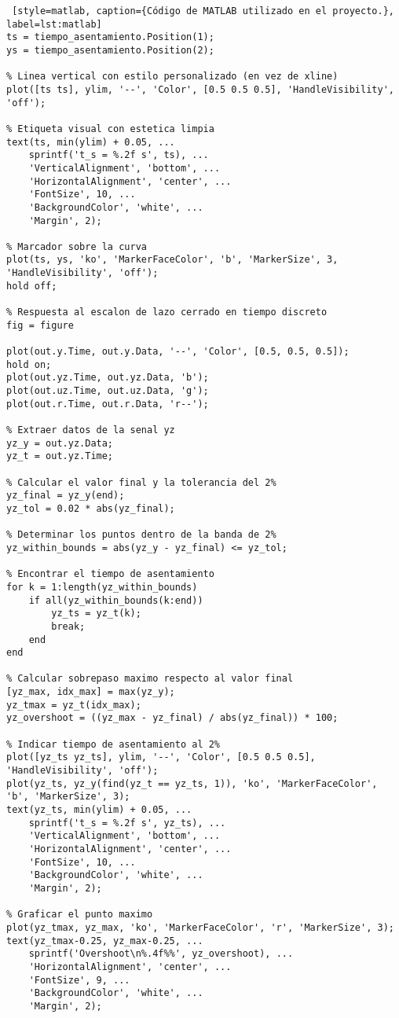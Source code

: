 \begin{adjustwidth}{0.5cm}{0.5cm}
\begin{lstlisting} [style=matlab, caption={Código de MATLAB utilizado en el proyecto.}, label=lst:matlab]
ts = tiempo_asentamiento.Position(1);
ys = tiempo_asentamiento.Position(2);

% Linea vertical con estilo personalizado (en vez de xline)
plot([ts ts], ylim, '--', 'Color', [0.5 0.5 0.5], 'HandleVisibility', 'off'); 

% Etiqueta visual con estetica limpia
text(ts, min(ylim) + 0.05, ... 
    sprintf('t_s = %.2f s', ts), ... 
    'VerticalAlignment', 'bottom', ... 
    'HorizontalAlignment', 'center', ... 
    'FontSize', 10, ... 
    'BackgroundColor', 'white', ... 
    'Margin', 2); 

% Marcador sobre la curva
plot(ts, ys, 'ko', 'MarkerFaceColor', 'b', 'MarkerSize', 3, 'HandleVisibility', 'off'); 
hold off; 

% Respuesta al escalon de lazo cerrado en tiempo discreto
fig = figure 

plot(out.y.Time, out.y.Data, '--', 'Color', [0.5, 0.5, 0.5]); 
hold on; 
plot(out.yz.Time, out.yz.Data, 'b'); 
plot(out.uz.Time, out.uz.Data, 'g'); 
plot(out.r.Time, out.r.Data, 'r--'); 

% Extraer datos de la senal yz
yz_y = out.yz.Data;
yz_t = out.yz.Time;

% Calcular el valor final y la tolerancia del 2%
yz_final = yz_y(end);
yz_tol = 0.02 * abs(yz_final);

% Determinar los puntos dentro de la banda de 2%
yz_within_bounds = abs(yz_y - yz_final) <= yz_tol;

% Encontrar el tiempo de asentamiento
for k = 1:length(yz_within_bounds)
    if all(yz_within_bounds(k:end))
        yz_ts = yz_t(k);
        break;
    end
end

% Calcular sobrepaso maximo respecto al valor final
[yz_max, idx_max] = max(yz_y);
yz_tmax = yz_t(idx_max);
yz_overshoot = ((yz_max - yz_final) / abs(yz_final)) * 100;

% Indicar tiempo de asentamiento al 2%
plot([yz_ts yz_ts], ylim, '--', 'Color', [0.5 0.5 0.5], 'HandleVisibility', 'off'); 
plot(yz_ts, yz_y(find(yz_t == yz_ts, 1)), 'ko', 'MarkerFaceColor', 'b', 'MarkerSize', 3); 
text(yz_ts, min(ylim) + 0.05, ... 
    sprintf('t_s = %.2f s', yz_ts), ... 
    'VerticalAlignment', 'bottom', ... 
    'HorizontalAlignment', 'center', ... 
    'FontSize', 10, ... 
    'BackgroundColor', 'white', ... 
    'Margin', 2); 

% Graficar el punto maximo
plot(yz_tmax, yz_max, 'ko', 'MarkerFaceColor', 'r', 'MarkerSize', 3); 
text(yz_tmax-0.25, yz_max-0.25, ... 
    sprintf('Overshoot\n%.4f%%', yz_overshoot), ... 
    'HorizontalAlignment', 'center', ... 
    'FontSize', 9, ... 
    'BackgroundColor', 'white', ... 
    'Margin', 2); 


\end{lstlisting}
\end{adjustwidth}
